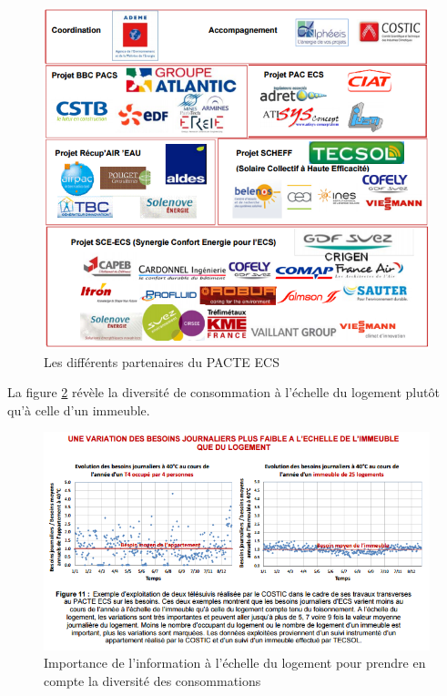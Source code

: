 \begin{figure}[h]
\centering
\includegraphics[scale=0.8]{Images/PACTEECS}
\caption{Les différents partenaires du PACTE ECS}
\label{fig:PACTEECS}
\end{figure}

La figure \ref{fig:Foisonnement_ECS} révèle la diversité de consommation à l'échelle du logement plutôt qu'à celle d'un immeuble.

\begin{figure}[h]
\centering
\includegraphics[scale=0.9]{Images/Foisonnement_ECS}
\caption{Importance de l'information à l'échelle du logement pour prendre en compte la diversité des consommations}
\label{fig:Foisonnement_ECS}
\end{figure}

